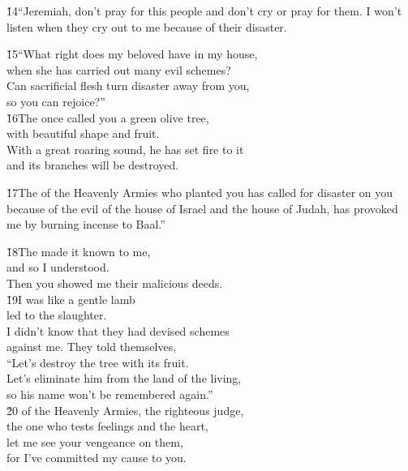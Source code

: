\v{14}``Jeremiah, don't pray for this people and don't cry or pray for them. I won't listen when they cry out to me because of their disaster.

\begin{poetry}
\poeml \v{15}``What right does my beloved have in my house, \\
\poemll    when she has carried out many evil schemes? \\
\poeml Can sacrificial flesh turn disaster away from you, \\
\poemll    so you can rejoice?'' \\
\poeml \v{16}The  once called you a green olive tree, \\
\poemll    with beautiful shape and fruit. \\
\poeml With a great roaring sound, he has set fire to it \\
\poemll    and its branches will be destroyed.
\end{poetry}

\v{17}The  of the Heavenly Armies who planted you has called for disaster on you because of the evil of the house of Israel and the house of Judah, has provoked me by burning incense to Baal.''

\begin{poetry}
\poeml \v{18}The  made it known to me, \\
\poemll    and so I understood. \\
\poemlll       Then you showed me their malicious deeds. \\
\poeml \v{19}I was like a gentle lamb \\
\poemll    led to the slaughter. \\
\poeml I didn't know that they had devised schemes \\
\poemll    against me. They told themselves, \\
\poeml ``Let's destroy the tree with its fruit. \\
\poemll    Let's eliminate him from the land of the living, \\
\poemlll       so his name won't be remembered again.'' \\
\poeml \v{20} of the Heavenly Armies, the righteous judge, \\
\poemll    the one who tests feelings and the heart, \\
\poeml let me see your vengeance on them, \\
\poemll    for I've committed my cause to you.
\end{poetry}

